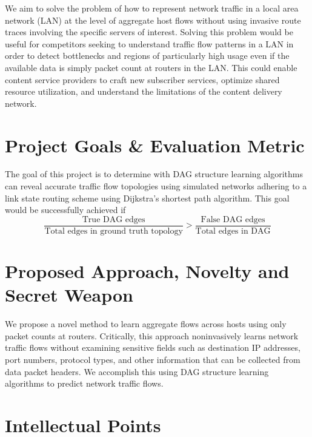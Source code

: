\documentclass[conference]{IEEEtran}
\begin{document}
We aim to solve the problem of how to represent network traffic in a local area network (LAN) at the level of aggregate host flows without using invasive route traces involving the specific servers of interest. Solving this problem would be useful for competitors seeking to understand traffic flow patterns in a LAN in order to detect bottlenecks and regions of particularly high usage even if the available data is simply packet count at routers in the LAN. This could enable content service providers to craft new subscriber services, optimize shared resource utilization, and understand the limitations of the content delivery network.


\section{Project Goals \& Evaluation Metric}

The goal of this project is to determine with DAG structure learning algorithms can reveal accurate traffic flow topologies using simulated networks adhering to a link state routing scheme using Dijkstra's shortest path algorithm. This goal would be successfully achieved if
\[
\frac{\text{True DAG edges}}{\text{Total edges in ground truth topology}} > \frac{\text{False DAG edges}}{\text{Total edges in DAG}}
\]

\section{Proposed Approach, Novelty and Secret Weapon}

We propose a novel method to learn aggregate flows across hosts using only packet counts at routers. Critically, this approach noninvasively learns network traffic flows without examining sensitive fields such as destination IP addresses, port numbers, protocol types, and other information that can be collected from data packet headers. We accomplish this using DAG structure learning algorithms to predict network traffic flows.

\section{Intellectual Points}
\end{document}

